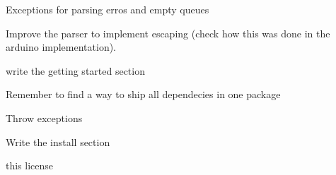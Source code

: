 
\begin{DoxyRefList}
\item[\label{todo__todo000003}%
\hypertarget{todo__todo000003}{}%
Namespace \hyperlink{namespacecmd}{cmd} ]Exceptions for parsing erros and empty queues 

Improve the parser to implement escaping (check how this was done in the arduino implementation).  
\item[\label{todo__todo000001}%
\hypertarget{todo__todo000001}{}%
page \hyperlink{index}{Cmd\+Messenger C++ Implementation} ]write the getting started section 

Remember to find a way to ship all dependecies in one package 

Throw exceptions

Write the install section  
\item[\label{todo__todo000004}%
\hypertarget{todo__todo000004}{}%
File \hyperlink{_cmd_messenger_8cpp}{Cmd\+Messenger.cpp} ]this license
\end{DoxyRefList}